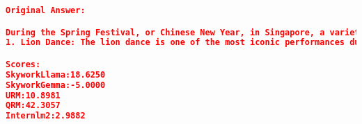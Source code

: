 \begin{lstlisting}[language=json,numbers=none]
Original Answer:

During the Spring Festival, or Chinese New Year, in Singapore, a variety of traditional performances can be seen that reflect the country's rich cultural heritage, particularly its Chinese influences. Singapore is a multi-ethnic nation with a significant Chinese population, which makes the Spring Festival an important and vibrant part of its cultural calendar. Here are some traditional performances you might encounter:
1. Lion Dance: The lion dance is one of the most iconic performances during the Spring Festival in Singapore. It is believed to bring good luck and fortune. Performers mimic a lion's movements in a lion costume to the beat of drums, gongs, and cymbals. The dance often includes acrobatic elements and the lions may interact with the audience or perform stunts such as "cai qing"

Scores:
SkyworkLlama:18.6250
SkyworkGemma:-5.0000
URM:10.8981
QRM:42.3057
Internlm2:2.9882
\end{lstlisting}